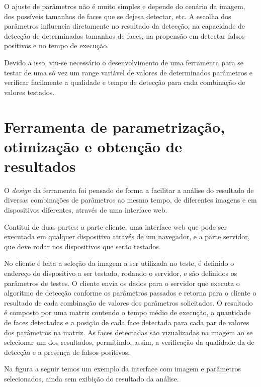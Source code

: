 O ajuste de parâmetros não é muito simples e depende do cenário da imagem, dos possíveis tamanhos de faces que se dejesa detectar, etc. A escolha dos parâmetros influencia diretamente no resultado da detecção, na capacidade de detecção de determinados tamanhos de faces, na propensão em detectar falsos-positivos e no tempo de execução.

Devido a isso, viu-se necessário o desenvolvimento de uma ferramenta para se testar de uma só vez um range variável de valores de determinados parâmetros e verificar facilmente a qualidade e tempo de detecção para cada combinação de valores testados. 

\section{Ferramenta de parametrização, otimização e obtenção de resultados}

O \textit{design} da ferramenta foi pensado de forma a facilitar a análise do resultado de diversas combinações de parâmetros ao mesmo tempo, de diferentes imagens e em dispositivos diferentes, através de uma interface web.

Contitui de duas partes: a parte cliente, uma interface web que pode ser executada em qualquer dispositivo através de um navegador, e a parte servidor, que deve rodar nos dispositivos que serão testados.

No cliente é feita a seleção da imagem a ser utilizada no teste, é definido o endereço do dispositivo a ser testado, rodando o servidor, e são definidos os parâmetros de testes. O cliente envia os dados para o servidor que executa o algoritmo de detecção conforme os parâmetros passados e retorna para o cliente o resultado de cada combinação de valores dos parâmetros solicitados. O resultado é composto por uma matriz contendo o tempo médio de execução, a quantidade de faces detectadas e a posição de cada face detectada para cada par de valores dos parâmetros na matriz. As faces detectadas são vizualizadas na imagem ao se selecionar um dos resultados, permitindo, assim, a verificação da qualidade da de detecção e a presença de falsos-positivos.

Na figura a seguir temos um exemplo da interface com imagem e parâmetros selecionados, ainda sem exibição do resultado da análise.

